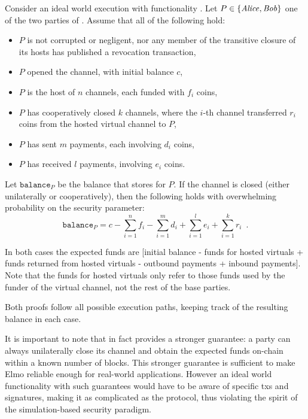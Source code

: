\begin{lemma}
\label{lemma:ideal-balance-informal}
  Consider an ideal world execution with functionality \fchan. Let $P \in
  \{\mathit{Alice}, \mathit{Bob}\}$ one of the two parties of \fchan.
  Assume that all of the following hold:
  \begin{itemize}
    \item $P$ is not corrupted or negligent, nor any member of the
    transitive closure of its hosts has published a revocation transaction,
    \item $P$ opened the channel, with initial balance $c$,
    \item $P$ is the host of $n$ channels, each funded with $f_i$ coins,
    \item $P$ has cooperatively closed $k$ channels, where the $i$-th channel
    transferred $r_i$ coins from the hosted virtual channel to $P$,
    \item $P$ has sent $m$ payments, each involving $d_i$ coins,
    \item $P$ has received $l$ payments, involving $e_i$ coins.
  \end{itemize}
  Let $\texttt{balance}_P$ be the balance that \fchan stores for $P$.
  If the channel is closed (either unilaterally or cooperatively), then the
  following holds with overwhelming probability on the security parameter:
  \begin{equation}
    \texttt{balance}_P = c - \sum\limits_{i=1}^n f_i - \sum\limits_{i=1}^m d_i +
    \sum\limits_{i=1}^l e_i + \sum\limits_{i=1}^k r_i \enspace.
  \end{equation}
\end{lemma}

  In both cases the expected funds are [initial balance - funds for hosted
  virtuals + funds returned from hosted virtuals - outbound payments + inbound
  payments]. Note that the funds for hosted virtuals only refer to those funds
  used by the funder of the virtual channel, not the rest of the base parties.

  Both proofs follow all possible execution paths, keeping track of the
  resulting balance in each case.

  It is important to note that in fact \pchan provides a stronger guarantee:
  a party can always unilaterally close its channel
  and obtain the expected funds on-chain within a known number of blocks.
  This stronger guarantee is sufficient to make Elmo reliable
  enough for real-world applications. However an ideal world
  functionality with such guarantees would have to be aware of specific
  txs and signatures, making it as complicated
  as the protocol, thus violating the spirit of the simulation-based security
  paradigm.

